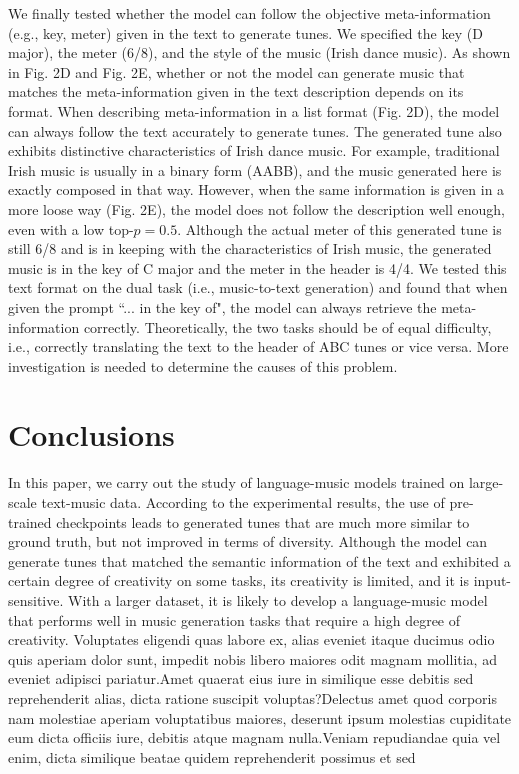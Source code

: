 \documentclass[letterpaper]{article} %
\begin{document}
We finally tested whether the model can follow the objective meta-information (e.g., key, meter) given in the text to generate tunes. We specified the key (D major), the meter (6/8), and the style of the music (Irish dance music). As shown in Fig. 2D and Fig. 2E, whether or not the model can generate music that matches the meta-information given in the text description depends on its format. When describing meta-information in a list format (Fig. 2D), the model can always follow the text accurately to generate tunes. The generated tune also exhibits distinctive characteristics of Irish dance music. For example, traditional Irish music is usually in a binary form (AABB), and the music generated here is exactly composed in that way. However, when the same information is given in a more loose way (Fig. 2E), the model does not follow the description well enough, even with a low top-$p=0.5$. Although the actual meter of this generated tune is still 6/8 and is in keeping with the characteristics of Irish music, the generated music is in the key of C major and the meter in the header is 4/4. We tested this text format on the dual task (i.e., music-to-text generation) and found that when given the prompt ``... in the key of", the model can always retrieve the meta-information correctly. Theoretically, the two tasks should be of equal difficulty, i.e., correctly translating the text to the header of ABC tunes or vice versa. More investigation is needed to determine the causes of this problem.

\vspace{-0.75mm}
\section{Conclusions}
In this paper, we carry out the study of language-music models trained on large-scale text-music data. According to the experimental results, the use of pre-trained checkpoints leads to generated tunes that are much more similar to ground truth, but not improved in terms of diversity. Although the model can generate tunes that matched the semantic information of the text and exhibited a certain degree of creativity on some tasks, its creativity is limited, and it is input-sensitive. With a larger dataset, it is likely to develop a language-music model that performs well in music generation tasks that require a high degree of creativity.
Voluptates eligendi quas labore ex, alias eveniet itaque ducimus odio quis aperiam dolor sunt, impedit nobis libero maiores odit magnam mollitia, ad eveniet adipisci pariatur.Amet quaerat eius iure in similique esse debitis sed reprehenderit alias, dicta ratione suscipit voluptas?Delectus amet quod corporis nam molestiae aperiam voluptatibus maiores, deserunt ipsum molestias cupiditate eum dicta officiis iure, debitis atque magnam nulla.Veniam repudiandae quia vel enim, dicta similique beatae quidem reprehenderit possimus et sed

\end{document}
